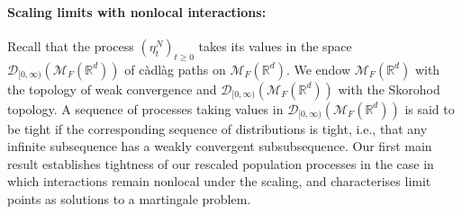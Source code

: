 \documentclass[12pt]{article}
\newcommand{\IR}{\mathbb R}
\newcommand{\measures}{\mathcal{M}_F(\IR^d)} %
\numberwithin{equation}{section}
\begin{document}
\paragraph{Scaling limits with nonlocal interactions:}
Recall that the process $(\eta_t^N)_{t\geq 0}$ takes its values in the space
${\mathcal D}_{[0,\infty)}(\measures)$ of c\`adl\`ag
paths on $\measures$. We endow $\measures$ with the topology of weak convergence
and 
${\mathcal D}_{[0,\infty)}(\measures)$ with the Skorohod topology.
A sequence of processes taking values in 
${\mathcal D}_{[0,\infty)}(\measures)$ is said to be tight if the corresponding
sequence of distributions is tight,
i.e., that any infinite subsequence has a weakly convergent subsubsequence.
Our first main result establishes tightness of our rescaled population processes in 
the case in which interactions remain nonlocal under the scaling, and 
characterises limit points as solutions to a martingale problem. 
\end{document}
